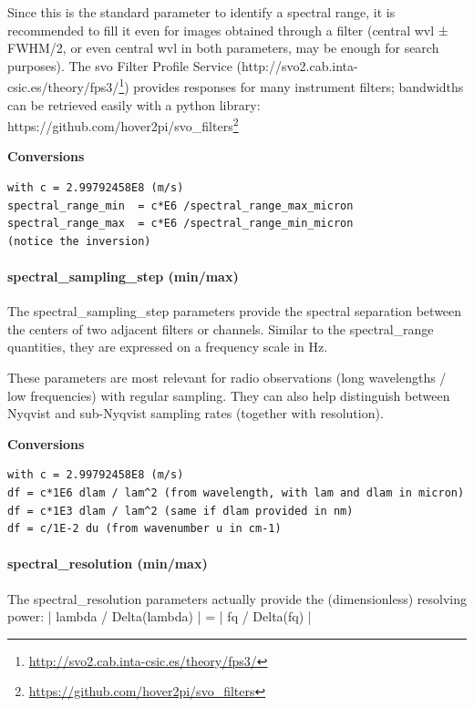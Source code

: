\documentclass[11pt,a4paper]{ivoa}
\begin{document}
Since this is the standard parameter to identify a spectral range, it is recommended to fill it even for images obtained through a filter (central wvl ± FWHM/2, or even central wvl in both parameters, may be enough for search purposes). The svo Filter Profile Service (http://svo2.cab.inta-csic.es/theory/fps3/\footnote{\url{http://svo2.cab.inta-csic.es/theory/fps3/}}) provides responses for many instrument filters; bandwidths can be retrieved easily with a python library: https://github.com/hover2pi/svo\_filters\footnote{\url{https://github.com/hover2pi/svo_filters}}


\textbf{Conversions}

\begin{verbatim}
with c = 2.99792458E8 (m/s)
spectral_range_min  = c*E6 /spectral_range_max_micron
spectral_range_max  = c*E6 /spectral_range_min_micron
(notice the inversion)
\end{verbatim}

\paragraph{spectral\_sampling\_step (min/max)}

The spectral\_sampling\_step parameters provide the spectral separation between the centers of two adjacent filters or channels. Similar to the spectral\_range quantities, they are expressed on a frequency scale in Hz. 

These parameters are most relevant for radio observations (long wavelengths / low frequencies) with regular sampling. They can also help distinguish between Nyqvist and sub-Nyqvist sampling rates (together with resolution).


\textbf{Conversions}

\begin{verbatim}
with c = 2.99792458E8 (m/s)
df = c*1E6 dlam / lam^2 (from wavelength, with lam and dlam in micron)
df = c*1E3 dlam / lam^2 (same if dlam provided in nm)
df = c/1E-2 du (from wavenumber u in cm-1)
\end{verbatim}

\paragraph{spectral\_resolution (min/max)}

The spectral\_resolution parameters actually provide the (dimensionless) resolving power: | lambda / Delta(lambda) | = | fq / Delta(fq) |  
\end{document}
